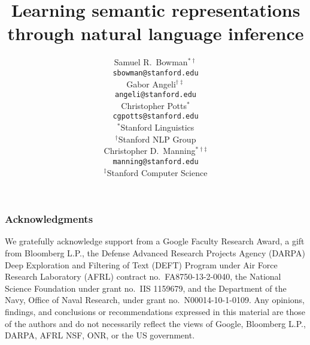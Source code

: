 \documentclass[11pt,a4paper]{article}
\title{Learning semantic representations through natural language inference}
\author{
Samuel R.\ Bowman$^{\ast\dag}$ \\
\texttt{sbowman@stanford.edu} \\
\And
Gabor Angeli$^{\dag\ddag}$ \\
\texttt{angeli@stanford.edu} \\
\AND
Christopher Potts$^{\ast}$\\
\texttt{cgpotts@stanford.edu} \\[2ex]
$^{\ast}$Stanford Linguistics\\
$^{\dag}$Stanford NLP Group\\
\And
Christopher D.\ Manning$^{\ast\dag\ddag}$\\
\texttt{manning@stanford.edu}\\[2ex]
$^{\ddag}$Stanford Computer Science
}
\date{}
\begin{document}
\maketitle









\subsubsection*{Acknowledgments}

%
We gratefully acknowledge support from %
a Google Faculty Research Award, %
a gift from Bloomberg L.P., 
the Defense Advanced Research Projects Agency (DARPA) Deep Exploration and Filtering of Text (DEFT) Program under Air Force Research Laboratory (AFRL) contract no.~FA8750-13-2-0040,
the National Science Foundation under grant no.~IIS 1159679, and %
the Department of the Navy, Office of Naval Research, under grant no.~N00014-10-1-0109.
%
Any opinions, findings, and conclusions or recommendations expressed in this material are those of the authors and do not necessarily reflect the views of 
Google, 
Bloomberg L.P.,
DARPA,
AFRL
NSF, 
ONR, or 
the US government.




\noindent{}
 
\end{document}
